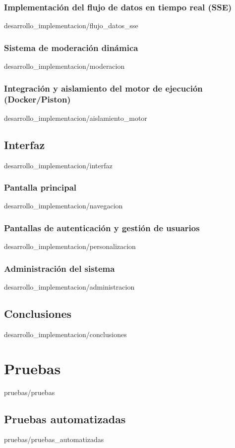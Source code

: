 \documentclass[epsbased,copyright,final,printable,covers,extendedindex,firstnumbered,tfg,gnuplot,lof,lot,loc]{tfgtfmthesisuam}
\begin{document}
    \subsection{Implementación del flujo de datos en tiempo real (SSE)\label{SS:DI_IMP_SSE}}{desarrollo_implementacion/flujo_datos_sse}
    \subsection{Sistema de moderación dinámica\label{SS:DI_IMP_MOD}}{desarrollo_implementacion/moderacion}
    \subsection{Integración y aislamiento del motor de ejecución (Docker/Piston)\label{SS:DI_IMP_MOTOR}}{desarrollo_implementacion/aislamiento_motor}
  \section{Interfaz\label{SEC:DI_INTERFAZ}}{desarrollo_implementacion/interfaz}
    \subsection{Pantalla principal\label{SS:DI_INT_NAVEGACION}}{desarrollo_implementacion/navegacion}
    \subsection{Pantallas de autenticación y gestión de usuarios\label{SS:DI_INT_EDITOR}}{desarrollo_implementacion/personalizacion}
    \subsection{Administración del sistema\label{SS:DI_INT_ADMIN}}{desarrollo_implementacion/administracion}
  \section{Conclusiones\label{SEC:DI_CONCLUSIONES}}{desarrollo_implementacion/conclusiones}

\chapter{Pruebas\label{CAP:PRUEBAS}}{pruebas/pruebas}
  \section{Pruebas automatizadas\label{SEC:PR_AUTOMATIZADAS}}{pruebas/pruebas_automatizadas}
\end{document}
